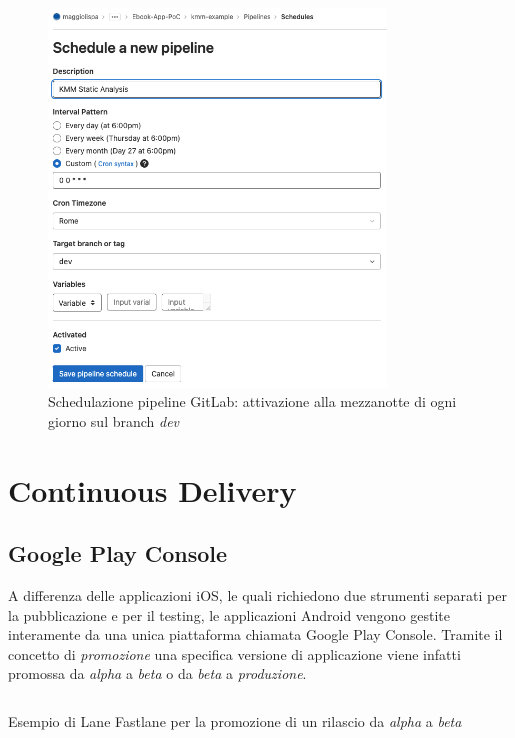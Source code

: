 \begin{figure}[H]
\centering
\includegraphics[width=0.8\textwidth]{img/Screenshot 2022-07-02 at 19.34.42.png}
\caption{Schedulazione pipeline GitLab: attivazione alla mezzanotte di ogni giorno sul branch \textit{dev}}
\end{figure}

\section{Continuous Delivery}

\subsection{Google Play Console}
A differenza delle applicazioni iOS, le quali richiedono due strumenti separati per la pubblicazione e per il testing, le applicazioni Android vengono gestite interamente da una unica piattaforma chiamata Google Play Console. Tramite il concetto di \textit{promozione} una specifica versione di applicazione viene infatti promossa da \textit{alpha} a \textit{beta} o da \textit{beta} a \textit{produzione}.

\begin{listing}[H]
\inputminted{ruby}{code/4-gpc-promote}
\caption{Esempio di Lane Fastlane per la promozione di un rilascio da \textit{alpha} a \textit{beta}}
\end{listing}

